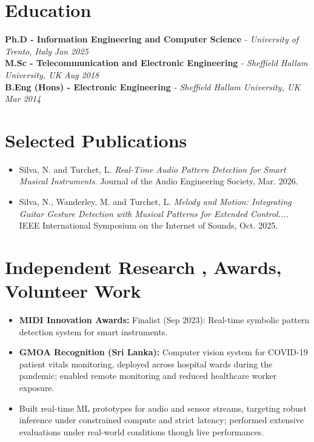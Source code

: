 \documentclass[11pt]{article}
\begin{document}
\section*{Education}
\noindent\textbf{Ph.D - Information Engineering and Computer Science} \textit{\small{ - University of Trento, Italy}} \hfill \textit{Jan 2025}\\[2pt]
\noindent\textbf{M.Sc - Telecommunication and Electronic Engineering} \textit{\small{ - Sheffield Hallam University, UK}} \hfill \textit{Aug 2018}\\[2pt]
\noindent\textbf{B.Eng (Hons) - Electronic Engineering} \textit{\small{ - Sheffield Hallam University, UK}} \hfill \textit{Mar 2014}

\section*{Selected Publications \footnotesize {}}
\begin{itemize}[leftmargin=1.2em, itemsep=-0.25em]
    \item Silva, N. and Turchet, L. \textit{Real-Time Audio Pattern Detection for Smart Musical Instruments}. Journal of the Audio Engineering Society, Mar. 2026.
    \item Silva, N., Wanderley, M. and Turchet, L. \textit{Melody and Motion: Integrating Guitar Gesture Detection with Musical Patterns for Extended Control....} IEEE International Symposium on the Internet of Sounds, Oct. 2025.
\end{itemize}

\section*{Independent Research , Awards, Volunteer Work}
\begin{itemize}[leftmargin=1.2em, itemsep=-0.25em]
    \item \textbf{MIDI Innovation Awards:} Finalist (Sep 2023): Real-time symbolic pattern detection system for smart instruments.
    \item \textbf{GMOA Recognition (Sri Lanka):} Computer vision system for COVID-19 patient vitals monitoring, deployed across hospital wards during the pandemic; enabled remote monitoring and reduced healthcare worker exposure.
    \item Built real-time ML prototypes for audio and sensor streams, targeting robust inference under constrained compute and strict latency; performed extensive evaluations under real-world conditions though live performances.
\end{itemize}
\end{document}

